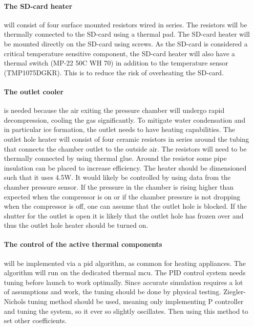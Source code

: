 \paragraph{The SD-card heater} will consist of four surface mounted resistors wired in series.
The resistors will be thermally connected to the SD-card using a thermal pad.
The SD-card heater will be mounted directly on the SD-card using screws.
As the SD-card is considered a critical temperature sensitive component, the SD-card heater will also have a thermal switch (MP-22 50C WH 70) in addition to the temperature sensor (TMP1075DGKR).
This is to reduce the risk of overheating the SD-card.

\paragraph{The outlet cooler} is needed because the air exiting the pressure chamber will undergo rapid decompression, cooling the gas significantly. 
To mitigate water condensation and in particular ice formation, the outlet needs to have heating capabilities.
The outlet hole heater will consist of four ceramic resistors in series around the tubing that connects the chamber outlet to the outside air.
The resistors will need to be thermally connected by using thermal glue.
Around the resistor some pipe insulation can be placed to increase efficiency.
The heater should be dimensioned such that it uses 4.5W.
It would likely be controlled by using data from the chamber pressure sensor. If the pressure in the chamber is rising higher than expected when the compressor is on or if the chamber pressure is not dropping when the compressor is off, one can assume that the outlet hole is blocked.
If the shutter for the outlet is open it is likely that the outlet hole has frozen over and thus the outlet hole heater should be turned on. 


\paragraph{The control of the active thermal components} will be implemented via a \gls{pid} algorithm, as common for heating appliances. 
The algorithm will run on the dedicated thermal \gls{mcu}. 
The PID control system needs tuning before launch to work optimally.
Since accurate simulation requires a lot of assumptions and work, the tuning should be done by physical testing.
Ziegler-Nichols tuning method should be used, meaning only implementing P controller and tuning the system, so it ever so slightly oscillates. Then using this method to set other coefficients. 


